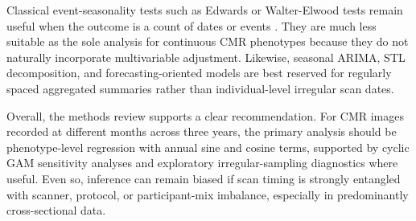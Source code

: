 Classical event-seasonality tests such as Edwards or Walter-Elwood tests remain useful when the outcome is a count of dates or events \cite{Edwards1961,Walter1975}. They are much less suitable as the sole analysis for continuous CMR phenotypes because they do not naturally incorporate multivariable adjustment. Likewise, seasonal ARIMA, STL decomposition, and forecasting-oriented models are best reserved for regularly spaced aggregated summaries rather than individual-level irregular scan dates.

Overall, the methods review supports a clear recommendation. For CMR images recorded at different months across three years, the primary analysis should be phenotype-level regression with annual sine and cosine terms, supported by cyclic GAM sensitivity analyses and exploratory irregular-sampling diagnostics where useful. Even so, inference can remain biased if scan timing is strongly entangled with scanner, protocol, or participant-mix imbalance, especially in predominantly cross-sectional data.
